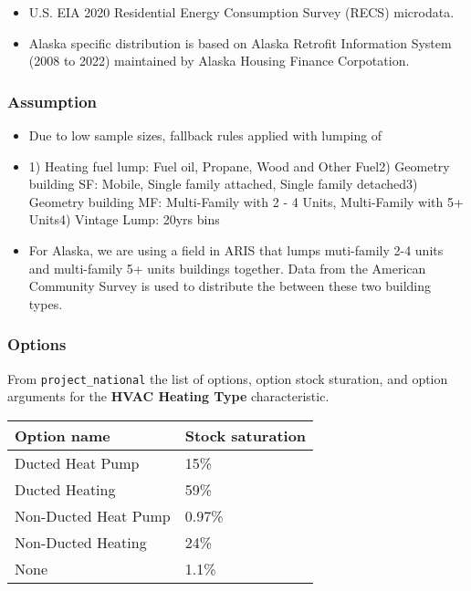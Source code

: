 \begin{itemize}
 
\item
  U.S. EIA 2020 Residential Energy Consumption Survey (RECS) microdata.
\item
  Alaska specific distribution is based on Alaska Retrofit Information
  System (2008 to 2022) maintained by Alaska Housing Finance
  Corpotation.
\end{itemize}

\subsubsection{Assumption}\label{assumption-43}

\begin{itemize}
 
\item
  Due to low sample sizes, fallback rules applied with lumping of
\item
  1) Heating fuel lump: Fuel oil, Propane, Wood and Other Fuel2)
  Geometry building SF: Mobile, Single family attached, Single family
  detached3) Geometry building MF: Multi-Family with 2 - 4 Units,
  Multi-Family with 5+ Units4) Vintage Lump: 20yrs bins
\item
  For Alaska, we are using a field in ARIS that lumps muti-family 2-4
  units and multi-family 5+ units buildings together. Data from the
  American Community Survey is used to distribute the between these two
  building types.
\end{itemize}

\subsubsection{Options}\label{options-72}

From \texttt{project\_national} the list of options, option stock
sturation, and option arguments for the \textbf{HVAC Heating Type}
characteristic.

\begin{longtable}[]{@{}ll@{}}
\toprule\noalign{}
Option name & Stock saturation \\
\midrule\noalign{}
\endhead
\bottomrule\noalign{}
\endlastfoot
Ducted Heat Pump & 15\% \\
Ducted Heating & 59\% \\
Non-Ducted Heat Pump & 0.97\% \\
Non-Ducted Heating & 24\% \\
None & 1.1\% \\
\end{longtable}

